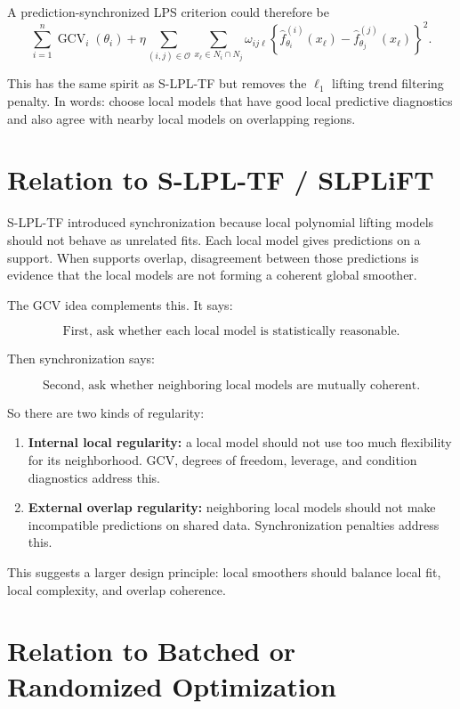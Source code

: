 \documentclass[11pt]{article}
\newcommand{\GCV}{\operatorname{GCV}}
\begin{document}
A prediction-synchronized LPS criterion could therefore be
\[
  \sum_{i=1}^{n}\GCV_i(\theta_i)
  +
  \eta
  \sum_{(i,j)\in\mathcal O}
  \sum_{x_\ell\in N_i\cap N_j}
  \omega_{ij\ell}
  \left\{
    \widehat f^{(i)}_{\theta_i}(x_\ell)
    -
    \widehat f^{(j)}_{\theta_j}(x_\ell)
  \right\}^2.
\]

This has the same spirit as S-LPL-TF but removes the \(\ell_1\) lifting trend
filtering penalty.  In words: choose local models that have good local
predictive diagnostics and also agree with nearby local models on overlapping
regions.

\section{Relation to S-LPL-TF / SLPLiFT}

S-LPL-TF introduced synchronization because local polynomial lifting models
should not behave as unrelated fits.  Each local model gives predictions on a
support.  When supports overlap, disagreement between those predictions is
evidence that the local models are not forming a coherent global smoother.

The GCV idea complements this.  It says:

\[
  \text{First, ask whether each local model is statistically reasonable.}
\]

Then synchronization says:

\[
  \text{Second, ask whether neighboring local models are mutually coherent.}
\]

So there are two kinds of regularity:

\begin{enumerate}[leftmargin=*]
  \item \textbf{Internal local regularity:} a local model should not use too
  much flexibility for its neighborhood.  GCV, degrees of freedom, leverage, and
  condition diagnostics address this.
  \item \textbf{External overlap regularity:} neighboring local models should
  not make incompatible predictions on shared data.  Synchronization penalties
  address this.
\end{enumerate}

This suggests a larger design principle: local smoothers should balance local
fit, local complexity, and overlap coherence.

\section{Relation to Batched or Randomized Optimization}
\end{document}
